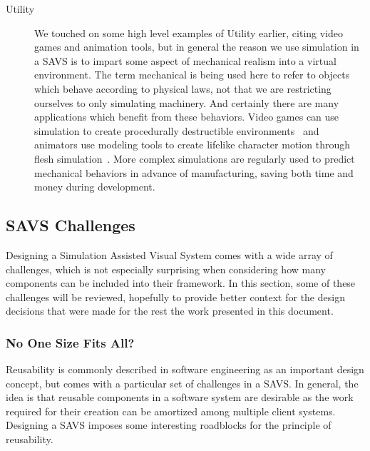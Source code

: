 \begin{description}
\item[Utility] We touched on some high level examples of Utility
  earlier, citing video games and animation tools, but in general the
  reason we use simulation in a SAVS is to impart some aspect of
  mechanical realism into a virtual environment. The term mechanical
  is being used here to refer to objects which behave according to
  physical laws, not that we are restricting ourselves to only
  simulating machinery. And certainly there are many applications
  which benefit from these behaviors. Video games can use simulation
  to create procedurally destructible environments~\citep{ParkeO:2009}
  and animators use modeling tools to create lifelike character motion
  through flesh simulation~\citep{McAdaST:2010}. More complex
  simulations are regularly used to predict mechanical behaviors in
  advance of manufacturing, saving both time and money during
  development.
      
\end{description}

\subsection{SAVS Challenges}

Designing a Simulation Assisted Visual System comes with a wide
array of challenges, which is not especially surprising when
considering how many components can be included into their
framework. In this section, some of these challenges will be reviewed,
hopefully to provide better context for the design decisions that were
made for the rest the work presented in this document.

\subsubsection{No One Size Fits All?}

Reusability is commonly described in software engineering as an
important design concept, but comes with a particular set of
challenges in a SAVS. In general, the idea is that reusable components
in a software system are desirable as the work required for their
creation can be amortized among multiple client systems.  Designing a
SAVS imposes some interesting roadblocks for the principle of
reusability.

